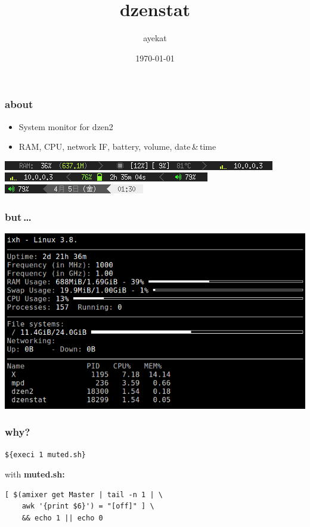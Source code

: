 \documentclass{beamer}
\title{dzenstat}
\author{ayekat}
\date{\today}
\begin{document}
\maketitle

\begin{frame}
  \frametitle{about}
  \begin{itemize}
    \pause\item System monitor for dzen2
    \pause\item RAM, CPU, network IF, battery, volume, date\,\&\,time
  \end{itemize}
  \pause
  \begin{center}
    \includegraphics[height=.8em]{img/dzenstat1.png}\\
    \includegraphics[height=.8em]{img/dzenstat2.png}\\
    \includegraphics[height=.8em]{img/dzenstat3.png}
  \end{center}
\end{frame}

\begin{frame}
  \frametitle{but\,\dots}
  \includegraphics[width=\textwidth]{img/conky.png}
\end{frame}

\begin{frame}[fragile]
  \frametitle{why?}
  \pause
  \begin{verbatim}${execi 1 muted.sh}\end{verbatim}
  with \textbf{muted.sh:}
  \begin{verbatim}
[ $(amixer get Master | tail -n 1 | \
    awk '{print $6}') = "[off]" ] \
    && echo 1 || echo 0
  \end{verbatim}
\end{frame}
\end{document}
